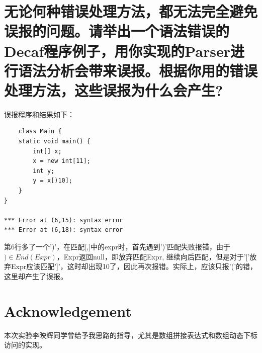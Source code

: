 \documentclass{article}
\begin{document}
\section{无论何种错误处理方法，都无法完全避免误报的问题。请举出一个语法错误的Decaf程序例子，用你实现的Parser进行语法分析会带来误报。根据你用的错误处理方法，这些误报为什么会产生?}
误报程序和结果如下：
\begin{lstlisting}
    class Main {
    static void main() {
        int[] x;
        x = new int[11];
        int y;
        y = x[)10];
    }
}

*** Error at (6,15): syntax error
*** Error at (6,18): syntax error
\end{lstlisting}
第6行多了一个')'，在匹配[,]中的expr时，首先遇到')'匹配失败报错，由于$) \in End(Expr)$，Expr返回null，即放弃匹配Expr, 继续向后匹配，但是对于'['放弃Expr应该匹配']'，这时却出现10了，因此再次报错。实际上，应该只报'('的错，这里却产生了误报。

\section*{Acknowledgement}
本次实验李映辉同学曾给予我思路的指导，尤其是数组拼接表达式和数组动态下标访问的实现。
\end{document}
